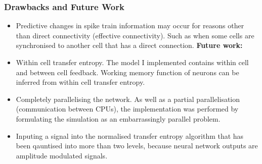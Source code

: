\documentclass{beamer}
\begin{document}


\begin{frame}
\frametitle{\textbf{Drawbacks and Future Work}}
\begin{itemize}

\vfill \item Predictive changes in spike train information may occur for reasons other than direct connectivity (effective connectivity). Such as when some cells are synchronised to another cell that has a direct connection.
\vfill
\textbf{Future work:}
\vfill \item Within cell transfer entropy. The model I implemented contains within cell and between cell feedback.  Working memory function of neurons can be inferred from within cell transfer entropy.

\vfill \item Completely parallelising the network. As well as a partial parallelisation (communication between CPUs), the implementation was performed by formulating the simulation as an embarrassingly parallel problem.

\vfill \item Inputing a signal into the normalised transfer entropy algorithm that has been qauntised into more than two levels, because neural network outputs are amplitude modulated signals.


\end{itemize}
\end{frame}
\end{document}

